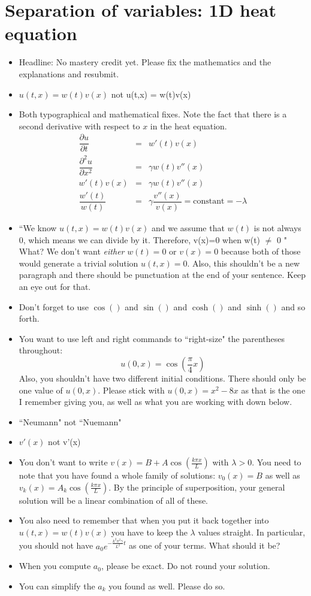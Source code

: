\documentclass{article}
\def\ds{\displaystyle}
\newcommand{\bea}{\begin{eqnarray*}}
\newcommand{\eea}{\end{eqnarray*}}
\begin{document}
\section{Separation of variables: 1D heat equation}
\begin{itemize}
\item Headline: No mastery credit yet. Please fix the mathematics and the explanations and resubmit. 
\item $u(t,x) = w(t)v(x)$ not u(t,x) = w(t)v(x)
\item Both typographical and mathematical fixes. Note the fact that there is a second derivative with respect to $x$ in the heat equation. \bea
\dfrac{\partial u}{\partial t} &=& w'(t)v(x) \\
\dfrac{\partial^2 u}{\partial x^2} &=& \gamma w(t)v''(x) \\
w'(t)v(x) &=& \gamma w(t)v''(x) \\
\dfrac{w'(t)}{w(t)} &=& \gamma \dfrac{v''(x)}{v(x)} = \mbox{constant} = -\lambda
\eea
\item ``We know $u(t,x) = w(t)v(x)$ and we assume that $w(t)$ is not always 0, which means we can divide by it.
Therefore, v(x)=0 when w(t) $\neq$ 0 " What? We don't want \emph{either} $w(t)=0$ or $v(x)=0$ because both of those would generate a trivial solution $u(t,x)=0$. Also, this shouldn't be a new paragraph and there should be punctuation at the end of your sentence. Keep an eye out for that. 
\item  Don't forget to use $\cos()$ and $\sin()$ and $\cosh()$ and $\sinh()$ and so forth. 
\item You want to use left and right commands to ``right-size" the parentheses throughout: 
\[u(0,x) = \cos\left(\frac{\pi}{4}x\right) \] Also, you shouldn't have two different initial conditions. There should only be one value of $u(0,x)$. Please stick with $\ds u(0,x) = x^2-8x$ as that is the one I remember giving you, as well as what you are working with down below. 
\item ``Neumann" not ``Nuemann"
\item $v'(x)$ not v'(x)
\item You don't want to write $\ds v(x) = B+A\cos\left(\frac{k\pi x}{L}\right)$ with $\lambda>0$. You need to note that you have found a whole family of solutions: $v_0(x) = B$ as well as $\ds v_k(x) = A_k\cos\left(\frac{k\pi x}{L}\right)$. By the principle of superposition, your general solution will be a linear combination of all of these. 
\item You also need to remember that when you put it back together into $u(t,x) = w(t)v(x)$ you have to keep the $\lambda$ values straight. In particular, you should not have $\ds a_0e^{-\frac{k^2\pi^2\gamma}{L^2}t}$ as one of your terms. What should it be?
\item When you compute $\ds a_0$, please be exact. Do not round your solution. 
\item You can simplify the $\ds a_k$ you found as well. Please do so. 
\end{itemize}
\end{document}
